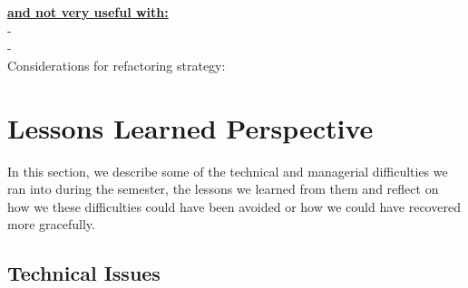 \documentclass{article}
\begin{document}
\nonindent \textbf{\underline{and not very useful with:}}\\
- \\
- \\

Considerations for refactoring strategy:

\section{Lessons Learned Perspective}
In this section, we describe some of the technical and managerial difficulties we ran into during the semester, the lessons we learned from them and reflect on how we these difficulties could have been avoided or how we could have recovered more gracefully.

\subsection{Technical Issues}
\end{document}
